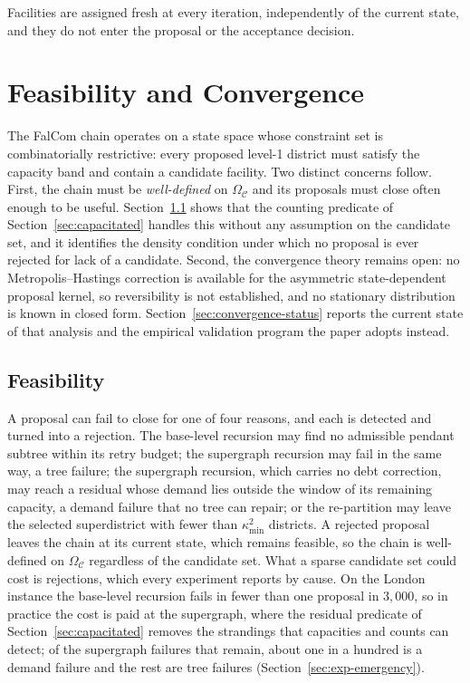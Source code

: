\documentclass[11pt]{article}
\theoremstyle{definition}
\begin{document}
Facilities are assigned fresh at every iteration, independently of the current state, and they do not enter the proposal or the acceptance decision.

\section{Feasibility and Convergence}
\label{sec:convergence}

The FalCom chain operates on a state space whose constraint set is
combinatorially restrictive: every proposed level-1 district must satisfy
the capacity band and contain a candidate facility. Two distinct concerns
follow. First, the chain must be \emph{well-defined} on $\Omega_{\mathcal{C}}$ and its proposals must close often enough to be useful. Section~\ref{sec:feasibility} shows that the counting predicate of Section~\ref{sec:capacitated} handles this without any assumption on the candidate set, and it identifies the density condition under which no proposal is ever rejected for lack of a candidate. Second, the
convergence theory remains open: no Metropolis--Hastings correction is available for the asymmetric state-dependent proposal kernel, so reversibility is not established, and no stationary distribution is known in closed form. Section~\ref{sec:convergence-status}
reports the current state of that analysis and the empirical validation
program the paper adopts instead.

\subsection{Feasibility}
\label{sec:feasibility}

A proposal can fail to close for one of four reasons, and each is detected and turned into a rejection. The base-level recursion may find no admissible pendant subtree within its retry budget; the supergraph recursion may fail in the same way, a tree failure; the supergraph recursion, which carries no debt correction, may reach a residual whose demand lies outside the window of its remaining capacity, a demand failure that no tree can repair; or the re-partition may leave the selected superdistrict with fewer than $\kappa^2_{\min}$ districts. A rejected proposal leaves the chain at its current state, which remains feasible, so the chain is well-defined on $\Omega_{\mathcal{C}}$ regardless of the candidate set. What a sparse candidate set could cost is rejections, which every experiment reports by cause. On the London instance the base-level recursion fails in fewer than one proposal in $3{,}000$, so in practice the cost is paid at the supergraph, where the residual predicate of Section~\ref{sec:capacitated} removes the strandings that capacities and counts can detect; of the supergraph failures that remain, about one in a hundred is a demand failure and the rest are tree failures (Section~\ref{sec:exp-emergency}).
\end{document}
